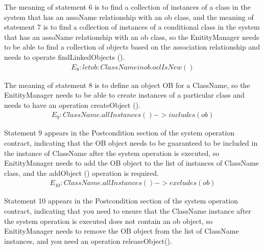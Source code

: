 \documentclass[pdflatex,sn-mathphys-num]{sn-jnl}%
\theoremstyle{thmstyleone}%
\theoremstyle{thmstyletwo}%
\theoremstyle{thmstylethree}%
\begin{document}
The meaning of statement 6 is to find a collection of instances of a class in the system that has an assoName relationship with an ob class, and the meaning of statement 7 is to find a collection of instances of a conditional class in the system that has an assoName relationship with an ob class, so the EnitityManager needs to be able to find a collection of objects based on the association relationship and needs to operate findLinkedObjects ().
\begin{gather*}
   E_8: let ob: ClassName in ob.oclIsNew() 
\end{gather*}

The meaning of statement 8 is to define an object OB for a ClassName, so the EnitityManager needs to be able to create instances of a particular class and needs to have an operation createObject ().
\begin{gather*}
  E_9: ClassName.allInstances() -> includes (ob)  
\end{gather*}

Statement 9 appears in the Postcondition section of the system operation contract, indicating that the OB object needs to be guaranteed to be included in the instance of ClassName after the system operation is executed, so EnitityManager needs to add the OB object to the list of instances of ClassName class, and the addObject () operation is required.
\begin{gather*}
  E_{10}: ClassName.allInstances() -> excludes(ob)  
\end{gather*}

Statement 10 appears in the Postcondition section of the system operation contract, indicating that you need to ensure that the ClassName instance after the system operation is executed does not contain an ob object, so EnitityManager needs to remove the OB object from the list of ClassName instances, and you need an operation releaseObject().
\end{document}

